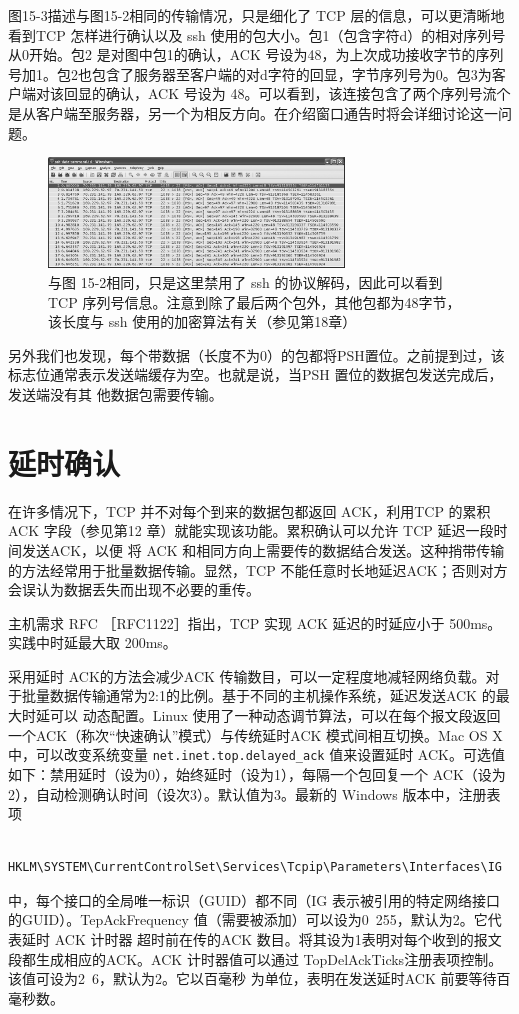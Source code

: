 图15-3描述与图15-2相同的传输情况，只是细化了 TCP 层的信息，可以更清晰地看到TCP 怎样进行确认以及 ssh 使用的包大小。包1（包含字符d）的相对序列号从0开始。包2
是对图中包1的确认，ACK 号设为48，为上次成功接收字节的序列号加1。包2也包含了服务器至客户端的对d字符的回显，字节序列号为0。包3为客户端对该回显的确认，ACK
号设为 48。可以看到，该连接包含了两个序列号流个是从客户端至服务器，另一个为相反方向。在介绍窗口通告时将会详细讨论这一问题。

\begin{figure}[!htb]
    \centering
	\includegraphics[width=0.7\textwidth]{imgs/15/15-3.png}
	\caption{与图 15-2相同，只是这里禁用了 ssh 的协议解码，因此可以看到 TCP 序列号信息。注意到除了最后两个包外，其他包都为48字节，该长度与 ssh 使用的加密算法有关（参见第18章）}
\end{figure}

另外我们也发现，每个带数据（长度不为0）的包都将PSH置位。之前提到过，该标志位通常表示发送端缓存为空。也就是说，当PSH 置位的数据包发送完成后，发送端没有其
他数据包需要传输。

\section{延时确认}
在许多情况下，TCP 并不对每个到来的数据包都返回 ACK，利用TCP 的累积ACK 字段（参见第12 章）就能实现该功能。累积确认可以允许 TCP 延迟一段时间发送ACK，以便
将 ACK 和相同方向上需要传的数据结合发送。这种捎带传输的方法经常用于批量数据传输。显然，TCP 不能任意时长地延迟ACK；否则对方会误认为数据丢失而出现不必要的重传。

\begin{tcolorbox}
    主机需求 RFC ［RFC1122］指出，TCP 实现 ACK 延迟的时延应小于 500ms。实践中时延最大取 200ms。
\end{tcolorbox}

采用延时 ACK的方法会减少ACK 传输数目，可以一定程度地减轻网络负载。对于批量数据传输通常为2:1的比例。基于不同的主机操作系统，延迟发送ACK 的最大时延可以
动态配置。Linux 使用了一种动态调节算法，可以在每个报文段返回一个ACK（称次“快速确认”模式）与传统延时ACK 模式间相互切换。Mac OS X 中，可以改变系统变量 
\verb|net.inet.top.delayed_ack| 值来设置延时 ACK。可选值如下：禁用延时（设为0），始终延时（设为1），每隔一个包回复一个 ACK（设为2），自动检测确认时间（设次3）。默认值为3。最新的
Windows 版本中，注册表项
\begin{verbatim}
    HKLM\SYSTEM\CurrentControlSet\Services\Tcpip\Parameters\Interfaces\IG
\end{verbatim}
中，每个接口的全局唯一标识（GUID）都不同（IG 表示被引用的特定网络接口的GUID）。TepAckFrequency 值（需要被添加）可以设为0~255，默认为2。它代表延时 ACK 计时器
超时前在传的ACK 数目。将其设为1表明对每个收到的报文段都生成相应的ACK。ACK 计时器值可以通过 TopDelAckTicks注册表项控制。该值可设为2~6，默认为2。它以百毫秒
为单位，表明在发送延时ACK 前要等待百毫秒数。

